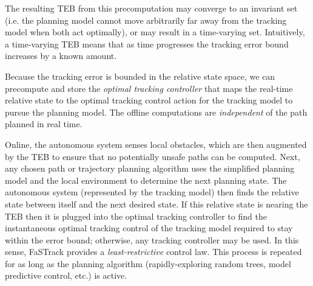 The resulting TEB from this precomputation may converge to an invariant set (i.e. the planning model cannot move arbitrarily far away from the tracking model when both act optimally), or may result in a time-varying set.
Intuitively, a time-varying TEB means that as time progresses the tracking error bound increases by a known amount.

Because the tracking error is bounded in the relative state space, we can precompute and store the \textit{optimal tracking controller} that maps the real-time relative state to the optimal tracking control action for the tracking model to pursue the planning model. 
The offline computations are \textit{independent} of the path planned in real time.

Online, the autonomous system senses local obstacles, which are then augmented by the TEB to ensure that no potentially unsafe paths can be computed. 
Next, any chosen path or trajectory planning algorithm uses the simplified planning model and the local environment to determine the next planning state. 
The autonomous system (represented by the tracking model) then finds the relative state between itself and the next desired state. 
If this relative state is nearing the TEB then it is plugged into the optimal tracking controller to find the instantaneous optimal tracking control of the tracking model required to stay within the error bound; otherwise, any tracking controller may be used. In this sense, FaSTrack provides a \emph{least-restrictive} control law.
This process is repeated for as long as the planning algorithm (rapidly-exploring random trees, model predictive control, etc.) is active. 

